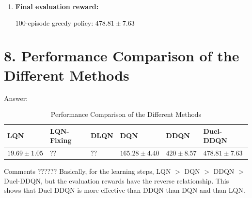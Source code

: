 \documentclass[12pt]{article}
\begin{document}
\begin{tcolorbox}
\begin{center}
\begin{enumerate}
\item {\bf Final evaluation reward:}

100-episode greedy policy: $478.81 \pm 7.63$

	\end{enumerate}
	\end{center}	
\end{tcolorbox}

\section*{8. Performance Comparison of the Different Methods}

\begin{tcolorbox}	
	Answer:	
	\begin{center}
	\begin{table}[H]
\centering
\caption{Performance Comparison of the Different Methods}
\label{cmp}
\begin{tabular}{|l|l|l|l|l|l|}
\hline
\textbf{LQN} & \textbf{LQN-Fixing} & \textbf{DLQN} & \textbf{DQN} & \textbf{DDQN} & \textbf{Duel-DDQN} \\ \hline
$19.69 \pm 1.05$& ?? & ?? & $165.28 \pm 4.40$ & $420 \pm 8.57$ & $478.81 \pm 7.63$  \\ \hline

\end{tabular}
\end{table}

Comments ?????? Basically, for the learning steps, LQN $>$ DQN $>$ DDQN $>$ Duel-DDQN, but the evaluation rewards have the reverse relationship. This shows that Duel-DDQN is more effective than DDQN than DQN and than LQN. 
	\end{center}	
\end{tcolorbox}
\end{document}
